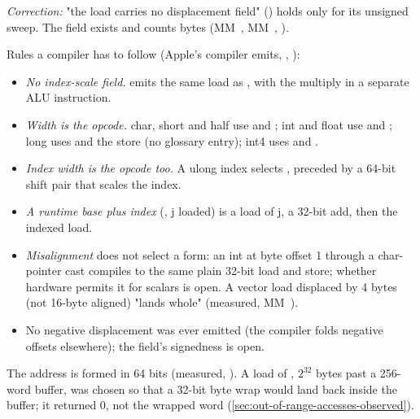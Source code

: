 \emph{Correction:} "the load carries no displacement field" () holds only for its unsigned
 sweep. The field exists and counts bytes (MM~, MM~, ).

Rules a compiler has to follow (Apple's compiler emits, ,
):

\begin{itemize}
\item \emph{No index-scale field.}  emits the same load as , with the multiply in a separate ALU instruction.
\item \emph{Width is the opcode.} char, short and half use  and ; int and float use
   and ; long uses  and the store
   (no glossary entry); int4 uses  and .
\item \emph{Index width is the opcode too.} A ulong index selects , preceded by a
  64-bit shift pair that scales the index.
\item \emph{A runtime base plus index} (, j loaded) is a load of j, a 32-bit add, then the indexed load.
\item \emph{Misalignment} does not select a form: an int at byte offset 1 through a char-pointer cast compiles to the same
  plain 32-bit load and store; whether hardware permits it for scalars is open. A vector load displaced by 4 bytes (not
  16-byte aligned) "lands whole" (measured, MM~).
\item No negative displacement was ever emitted (the compiler folds negative offsets elsewhere); the field's signedness is
  open.
\end{itemize}

The address is formed in 64 bits (measured, ). A load of , $2^{32}$
bytes past a 256-word buffer, was chosen so that a 32-bit byte wrap would land back inside the buffer; it returned 0, not the
wrapped word (\cref{sec:out-of-range-accesses-observed}).

